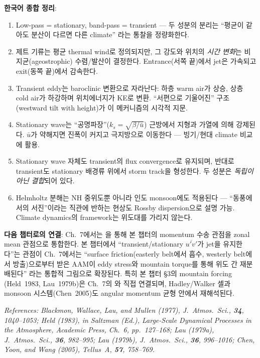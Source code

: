 \begin{hisublock}
\textbf{한국어 종합 정리}:
\begin{enumerate}
  \item Low-pass = stationary, band-pass = transient ---
        두 성분의 분리는 ``평균이 같아도 분산이 다르면 다른 climate''
        라는 통찰을 정량화한다.
  \item 제트 기류는 평균 thermal wind로 정의되지만, 그 강도와 위치의
        \emph{시간 변화}는 비지균(ageostrophic) 수렴/발산이 결정한다.
        Entrance(서쪽 끝)에서 jet은 가속되고 exit(동쪽 끝)에서 감속한다.
  \item Transient eddy는 baroclinic 변환으로 자라난다:
        하층 warm air가 상승, 상층 cold air가 하강하며 위치에너지가 KE로 변환.
        ``서편으로 기울어진'' 구조(westward tilt with height)가 이 메커니즘의
        시각적 지문.
  \item Stationary wave는 ``공명파장''($k_s = \sqrt{\beta/\bar u}$) 근방에서
        지형과 가열에 의해 강제된다.  $\bar u$가 약해지면 진폭이 커지고
        극지방으로 이동한다 --- 빙기/현대 climate 비교에 활용.
  \item Stationary wave 자체도 transient의 flux convergence로 유지되며,
        반대로 transient도 stationary 배경류 위에서 storm track을 형성한다.
        두 성분은 \emph{독립이 아닌 결합}되어 있다.
  \item Helmholtz 분해는 NH 중위도뿐 아니라 인도 monsoon에도 적용된다 ---
        ``동풍에서의 서진''이라는 직관에 반하는 현상도 Rossby dispersion으로
        설명 가능.  Climate dynamics의 framework는 위도대를 가리지 않는다.
\end{enumerate}

\medskip
\textbf{다음 챕터로의 연결}: Ch.~7에서는 을 통해
본 챕터의 momentum 수송 관점을 zonal mean 관점으로 통합한다.
본 챕터에서 ``transient/stationary $\overline{u'v'}$가 jet을 유지한다''는
관점이 Ch.~7에서는 ``surface friction(easterly belt에서 흡수, westerly belt에서
방출)으로부터 받은 AAM이 eddy stress와 mountain torque를 통해 위도 간 재분배된다''
라는 통합적 그림으로 확장된다.  특히 본 챕터 \S3의 mountain forcing
(Held~1983, Lau~1979b)은 Ch.~7의 와 직접 연결되며,
Hadley/Walker 셀과 monsoon 시스템(Chen~2005)도 angular momentum 균형 안에서
재해석된다.
\end{hisublock}

\vspace{6pt}
\noindent\textit{References:
Blackmon, Wallace, Lau, and Mullen (1977), \emph{J.~Atmos.~Sci.},
\textbf{34}, 1040--1053;
Held (1983), in Saltzman (Ed.), \emph{Large-Scale Dynamical Processes
in the Atmosphere}, Academic Press, Ch.~6, pp.~127--168;
Lau (1979a), \emph{J.~Atmos.~Sci.}, \textbf{36}, 982--995;
Lau (1979b), \emph{J.~Atmos.~Sci.}, \textbf{36}, 996--1016;
Chen, Yoon, and Wang (2005), \emph{Tellus~A}, \textbf{57}, 758--769.}
